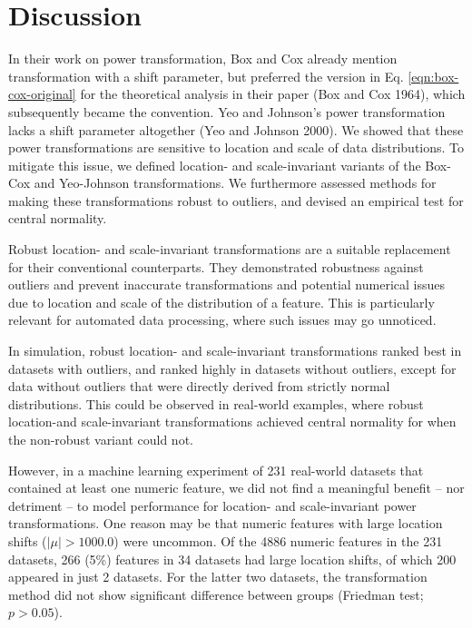 \documentclass[
  a4paper,
]{article}
\begin{document}
\section{Discussion}\label{discussion}

In their work on power transformation, Box and Cox already mention
transformation with a shift parameter, but preferred the version in Eq.
\ref{eqn:box-cox-original} for the theoretical analysis in their paper
(Box and Cox 1964), which subsequently became the convention. Yeo and
Johnson's power transformation lacks a shift parameter altogether (Yeo
and Johnson 2000). We showed that these power transformations are
sensitive to location and scale of data distributions. To mitigate this
issue, we defined location- and scale-invariant variants of the Box-Cox
and Yeo-Johnson transformations. We furthermore assessed methods for
making these transformations robust to outliers, and devised an
empirical test for central normality.

Robust location- and scale-invariant transformations are a suitable
replacement for their conventional counterparts. They demonstrated
robustness against outliers and prevent inaccurate transformations and
potential numerical issues due to location and scale of the distribution
of a feature. This is particularly relevant for automated data
processing, where such issues may go unnoticed.

In simulation, robust location- and scale-invariant transformations
ranked best in datasets with outliers, and ranked highly in datasets
without outliers, except for data without outliers that were directly
derived from strictly normal distributions. This could be observed in
real-world examples, where robust location-and scale-invariant
transformations achieved central normality for when the non-robust
variant could not.

However, in a machine learning experiment of 231 real-world datasets
that contained at least one numeric feature, we did not find a
meaningful benefit -- nor detriment -- to model performance for
location- and scale-invariant power transformations. One reason may be
that numeric features with large location shifts (\(|\mu| > 1000.0\))
were uncommon. Of the 4886 numeric features in the 231 datasets, 266
(5\%) features in 34 datasets had large location shifts, of which 200
appeared in just 2 datasets. For the latter two datasets, the
transformation method did not show significant difference between groups
(Friedman test; \(p > 0.05\)).
\end{document}
